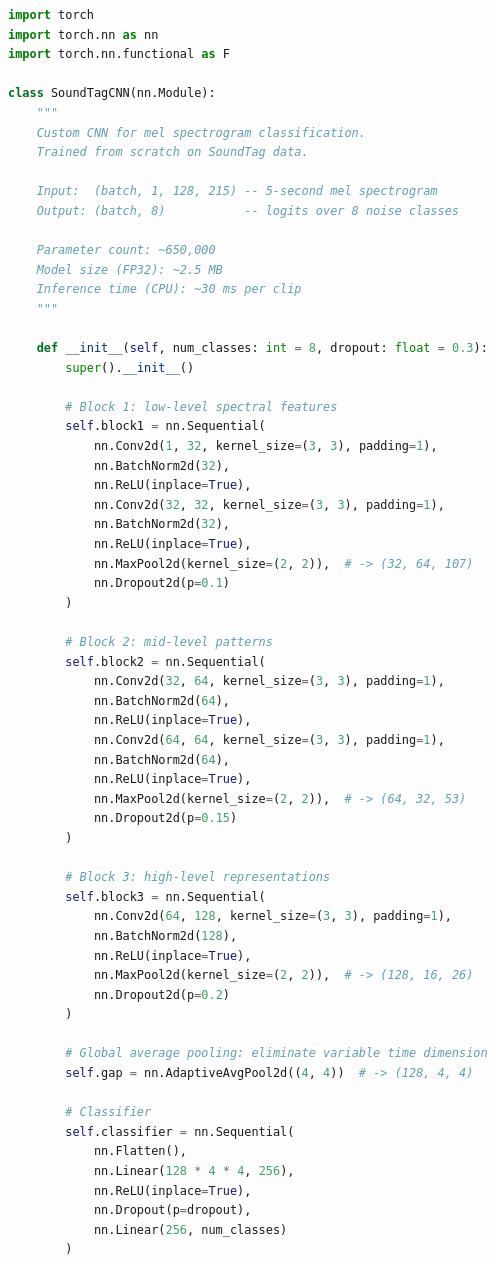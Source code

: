 \documentclass[11pt,a4paper]{article}
\begin{document}
\begin{lstlisting}[language=Python, caption={SoundTagCNN: Custom CNN Trained From Scratch}]
import torch
import torch.nn as nn
import torch.nn.functional as F

class SoundTagCNN(nn.Module):
    """
    Custom CNN for mel spectrogram classification.
    Trained from scratch on SoundTag data.

    Input:  (batch, 1, 128, 215) -- 5-second mel spectrogram
    Output: (batch, 8)           -- logits over 8 noise classes

    Parameter count: ~650,000
    Model size (FP32): ~2.5 MB
    Inference time (CPU): ~30 ms per clip
    """

    def __init__(self, num_classes: int = 8, dropout: float = 0.3):
        super().__init__()

        # Block 1: low-level spectral features
        self.block1 = nn.Sequential(
            nn.Conv2d(1, 32, kernel_size=(3, 3), padding=1),
            nn.BatchNorm2d(32),
            nn.ReLU(inplace=True),
            nn.Conv2d(32, 32, kernel_size=(3, 3), padding=1),
            nn.BatchNorm2d(32),
            nn.ReLU(inplace=True),
            nn.MaxPool2d(kernel_size=(2, 2)),  # -> (32, 64, 107)
            nn.Dropout2d(p=0.1)
        )

        # Block 2: mid-level patterns
        self.block2 = nn.Sequential(
            nn.Conv2d(32, 64, kernel_size=(3, 3), padding=1),
            nn.BatchNorm2d(64),
            nn.ReLU(inplace=True),
            nn.Conv2d(64, 64, kernel_size=(3, 3), padding=1),
            nn.BatchNorm2d(64),
            nn.ReLU(inplace=True),
            nn.MaxPool2d(kernel_size=(2, 2)),  # -> (64, 32, 53)
            nn.Dropout2d(p=0.15)
        )

        # Block 3: high-level representations
        self.block3 = nn.Sequential(
            nn.Conv2d(64, 128, kernel_size=(3, 3), padding=1),
            nn.BatchNorm2d(128),
            nn.ReLU(inplace=True),
            nn.MaxPool2d(kernel_size=(2, 2)),  # -> (128, 16, 26)
            nn.Dropout2d(p=0.2)
        )

        # Global average pooling: eliminate variable time dimension
        self.gap = nn.AdaptiveAvgPool2d((4, 4))  # -> (128, 4, 4)

        # Classifier
        self.classifier = nn.Sequential(
            nn.Flatten(),
            nn.Linear(128 * 4 * 4, 256),
            nn.ReLU(inplace=True),
            nn.Dropout(p=dropout),
            nn.Linear(256, num_classes)
        )


\end{lstlisting}
\end{document}
